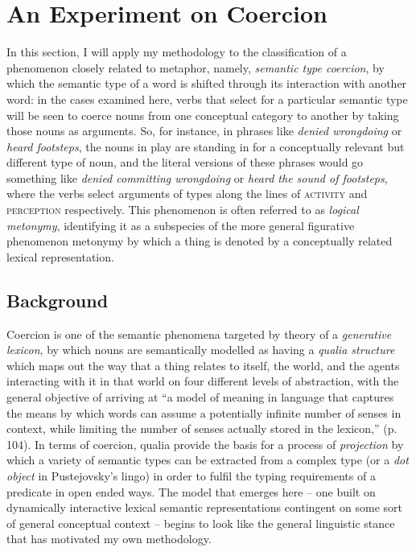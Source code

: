 \section{An Experiment on Coercion} \label{sec:coerperiment}
In this section, I will apply my methodology to the classification of a phenomenon closely related to metaphor, namely, \emph{semantic type coercion}, by which the semantic type of a word is shifted through its interaction with another word: in the cases examined here, verbs that select for a particular semantic type will be seen to coerce nouns from one conceptual category to another by taking those nouns as arguments.  So, for instance, in phrases like \emph{denied wrongdoing} or \emph{heard footsteps}, the nouns in play are standing in for a conceptually relevant but different type of noun, and the literal versions of these phrases would go something like \emph{denied committing wrongdoing} or \emph{heard the sound of footsteps}, where the verbs select arguments of types along the lines of \textsc{activity} and \textsc{perception} respectively.  This phenomenon is often referred to as \emph{logical metonymy}, identifying it as a subspecies of the more general figurative phenomenon metonymy by which a thing is denoted by a conceptually related lexical representation.

\subsection{Background}
Coercion is one of the semantic phenomena targeted by  theory of a \emph{generative lexicon}, by which nouns are semantically modelled as having a \emph{qualia structure} which maps out the way that a thing relates to itself, the world, and the agents interacting with it in that world on four different levels of abstraction, with the general objective of arriving at ``a model of meaning in language that captures the means by which words can assume a potentially infinite number of senses in context, while limiting the number of senses actually stored in the lexicon,'' (p. 104).  In terms of coercion, qualia provide the basis for a process of \emph{projection} by which a variety of semantic types can be extracted from a complex type (or a \emph{dot object} in Pustejovsky's lingo) in order to fulfil the typing requirements of a predicate in open ended ways.  The model that emerges here -- one built on dynamically interactive lexical semantic representations contingent on some sort of general conceptual context -- begins to look like the general linguistic stance that has motivated my own methodology.

